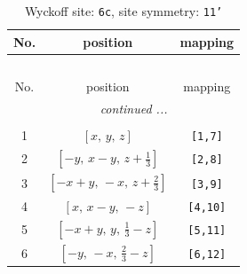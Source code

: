 \documentclass[fleqn,8pt]{jsarticle}
\begin{document}
\renewcommand{\arraystretch}{1.2}
\begin{longtable}{ccc}
\caption{Wyckoff site: {\tt 6c}, site symmetry: {\tt 11'}}
 \\
 \hline \hline
No. & position & mapping \\ \hline \endfirsthead

\multicolumn{2}{l}{\tablename\ \thetable{}} \\
 \hline \hline
No. & position & mapping \\ \hline \endhead

 \hline \hline
\multicolumn{2}{r}{\footnotesize\it continued ...} \\ \endfoot

 \hline \hline
\multicolumn{2}{r}{} \\ \endlastfoot

1 & $\left[ x,\, y,\, z \right]$ & {\tt [1,7]} \\ \hline
2 & $\left[ - y,\, x - y,\, z + \frac{1}{3} \right]$ & {\tt [2,8]} \\ \hline
3 & $\left[ - x + y,\, - x,\, z + \frac{2}{3} \right]$ & {\tt [3,9]} \\ \hline
4 & $\left[ x,\, x - y,\, - z \right]$ & {\tt [4,10]} \\ \hline
5 & $\left[ - x + y,\, y,\, \frac{1}{3} - z \right]$ & {\tt [5,11]} \\ \hline
6 & $\left[ - y,\, - x,\, \frac{2}{3} - z \right]$ & {\tt [6,12]} \\
\end{longtable}
\end{document}
